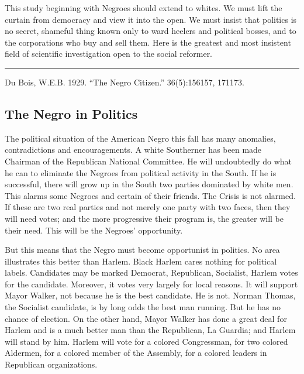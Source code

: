 \documentclass[letterpaper,10pt,english]{jupyterBook}
\begin{document}
\sphinxAtStartPar
This study beginning with Negroes should extend to whites. We must lift the curtain from democracy and view it into the open. We must insist that politics is no secret, shameful thing known only to ward heelers and political bosses, and to the corporations who buy and sell them. Here is the greatest and most insistent field of scientific investigation open to the social reformer.


\bigskip\hrule\bigskip


\sphinxAtStartPar
{} Du Bois, W.E.B. 1929. “The Negro Citizen.”   36(5):156\sphinxhyphen{}157, 171\sphinxhyphen{}173.


\subsection{The Negro in Politics}
\label{\detokenize{Volumes/36/11/negro_in_politics:the-negro-in-politics}}\label{\detokenize{Volumes/36/11/negro_in_politics::doc}}
\sphinxAtStartPar
The political situation of the American Negro this fall has many anomalies, contradictions and encouragements. A white Southerner has been made Chairman of the Republican National Committee. He will undoubtedly do what he can to eliminate the Negroes from political activity in the South. If he is successful, there will grow up in the South two parties dominated by white men. This alarms some Negroes and certain of their friends. The Crisis is not alarmed. If these are two real parties and not merely one party with two faces, then they will need votes; and the more progressive their program is, the greater will be their need. This will be the Negroes’ opportunity.

\sphinxAtStartPar
But this means that the Negro must become opportunist in politics. No area illustrates this better than Harlem. Black Harlem cares nothing for political labels. Candidates may be marked Democrat, Republican, Socialist, Harlem votes for the candidate. Moreover, it votes very largely for local reasons. It will support Mayor Walker, not because he is the best candidate. He is not. Norman Thomas, the Socialist candidate, is by long odds the best man running. But he has no chance of election. On the other hand, Mayor Walker has done a great deal for Harlem and is a much better man than the Republican, La Guardia; and Harlem will stand by him. Harlem will vote for a colored Congressman, for two colored Aldermen, for a colored member of the Assembly, for a colored leaders in Republican organizations.
\end{document}

